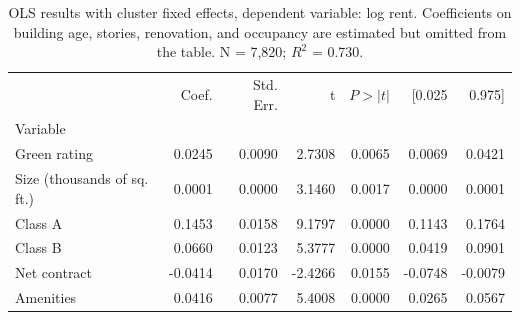 \begin{table}[H]
\caption{OLS results with cluster fixed effects, dependent variable: log rent. Coefficients on building age, stories, renovation, and occupancy are estimated but omitted from the table. N = 7,820; $R^2$ = 0.730.}
\label{tab:ols}
\begin{tabular}{lrrrrrr}
\toprule
 & Coef. & Std. Err. & t & $P>|t|$ & [0.025 & 0.975] \\
Variable &  &  &  &  &  &  \\
\midrule
Green rating & 0.0245 & 0.0090 & 2.7308 & 0.0065 & 0.0069 & 0.0421 \\
Size (thousands of sq. ft.) & 0.0001 & 0.0000 & 3.1460 & 0.0017 & 0.0000 & 0.0001 \\
Class A & 0.1453 & 0.0158 & 9.1797 & 0.0000 & 0.1143 & 0.1764 \\
Class B & 0.0660 & 0.0123 & 5.3777 & 0.0000 & 0.0419 & 0.0901 \\
Net contract & -0.0414 & 0.0170 & -2.4266 & 0.0155 & -0.0748 & -0.0079 \\
Amenities & 0.0416 & 0.0077 & 5.4008 & 0.0000 & 0.0265 & 0.0567 \\
\bottomrule
\end{tabular}
\end{table}
